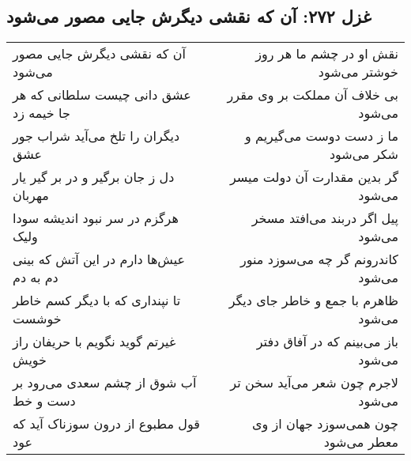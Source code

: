 \begin{center}
\section*{غزل ۲۷۲: آن که نقشی دیگرش جایی مصور می‌شود}
\label{sec:272}
\begin{longtable}{l p{0.5cm} r}
آن که نقشی دیگرش جایی مصور می‌شود
&&
نقش او در چشم ما هر روز خوشتر می‌شود
\\
عشق دانی چیست سلطانی که هر جا خیمه زد
&&
بی خلاف آن مملکت بر وی مقرر می‌شود
\\
دیگران را تلخ می‌آید شراب جور عشق
&&
ما ز دست دوست می‌گیریم و شکر می‌شود
\\
دل ز جان برگیر و در بر گیر یار مهربان
&&
گر بدین مقدارت آن دولت میسر می‌شود
\\
هرگزم در سر نبود اندیشه سودا ولیک
&&
پیل اگر دربند می‌افتد مسخر می‌شود
\\
عیش‌ها دارم در این آتش که بینی دم به دم
&&
کاندرونم گر چه می‌سوزد منور می‌شود
\\
تا نپنداری که با دیگر کسم خاطر خوشست
&&
ظاهرم با جمع و خاطر جای دیگر می‌شود
\\
غیرتم گوید نگویم با حریفان راز خویش
&&
باز می‌بینم که در آفاق دفتر می‌شود
\\
آب شوق از چشم سعدی می‌رود بر دست و خط
&&
لاجرم چون شعر می‌آید سخن تر می‌شود
\\
قول مطبوع از درون سوزناک آید که عود
&&
چون همی‌سوزد جهان از وی معطر می‌شود
\\
\end{longtable}
\end{center}
